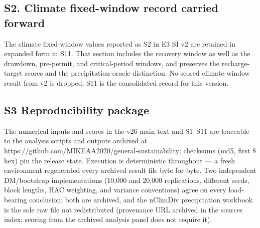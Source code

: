 \documentclass[11pt]{article}
\begin{document}
\subsection{S2. Climate fixed-window record carried forward}

The climate fixed-window values reported as S2 in E3 SI v2 are retained in expanded form in S11. That section includes the recovery window as well as the drawdown, pre-permit, and critical-period windows, and preserves the recharge-target scores and the precipitation-oracle distinction. No scored climate-window result from v2 is dropped; S11 is the consolidated record for this version.

\subsection{S3 Reproducibility
package}\label{s3-reproducibility-package}

The numerical inputs and scores in the v26 main text and S1--S11 are
traceable to the analysis scripts and outputs archived at
https://github.com/MIKEAA2020/general-sustainability; checksums (md5,
first 8 hex) pin the release state. Execution is deterministic
throughout --- a fresh environment regenerated every archived result
file byte for byte. Two independent DM/bootstrap implementations (10,000
and 20,000 replications, different seeds, block lengths, HAC weighting,
and variance conventions) agree on every load-bearing conclusion; both
are archived, and the nClimDiv precipitation workbook is the sole raw
file not redistributed (provenance URL archived in the sources index;
scoring from the archived analysis panel does not require it).
\end{document}
